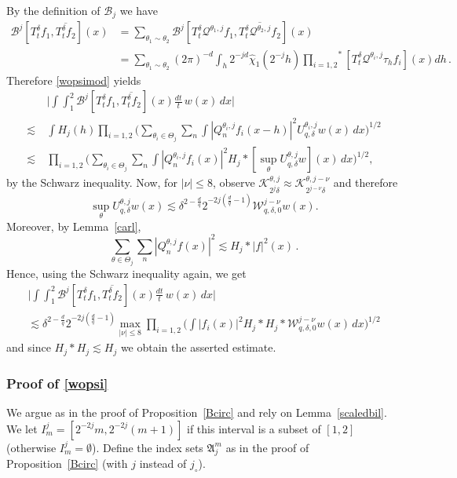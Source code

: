 \documentclass[11pt]{amsart}
\theoremstyle{definition}
\numberwithin{theorem}{section}
\numberwithin{definition}{section}
\def\prodstar{{\prod_{i=1,2}}^{\!\!*}}
\newcommand{\note}[1]{\footnote{\texttt{\Small #1}}}
\def\lc{\lesssim}
\def\fA{{\mathfrak {A}}}
\def\cB{{\mathcal {B}}}
\def\cK{{\mathcal {K}}}
\def\cQ{{\mathcal {Q}}}
\def\cW{{\mathcal {W}}}
\begin{document}
By the definition of $\cB_j$ we have
\begin{align*}
\cB^j [T^\delta_t f_1,\overline{T^{\delta}_t f_2}](x)
&=\sum_{\theta_1\sim\theta_2}
\cB^j [T^\delta_t \cQ^{\theta_1,j}f_1,\overline{T^{\delta}_t\cQ^{\theta_2,j} f_2}](x)
\\
&=\sum_{\theta_1\sim\theta_2}(2\pi)^{-d} \int_h 2^{-jd}\widehat \chi_1(2^{-j}h)
\prodstar [T^\delta_t \cQ^{\theta_i,j}\tau_hf_i](x) dh\,.
\end{align*}
Therefore \eqref{wopsimod} yields
\begin{align*}
&\Big|\int\int_1^2 \cB^j [T^\delta_t f_1,\overline{T^{\delta}_t f_2}](x)
 \frac{dt}{t}\,w(x) \,dx\Big|
\\
\lc\ &
\int H_j(h) \prod_{i=1,2} \Big(\sum_{\theta_i\in \Theta_j}
\sum_n\int |Q^{\theta_i,j}_nf_i(x-h)|^2
U_{q,\delta}^{\theta_i,j} w(x)
\,dx\Big)^{1/2}
\\
\lc\ &
\prod_{i=1,2} \Big(\sum_{\theta_i\in \Theta_j}\sum_n\int |Q^{\theta_i,j}_nf_i(x)|^2
H_j*[\sup_{\theta}  U_{q,\delta}^{\theta,j} w](x)
\,dx\Big)^{1/2},
\end{align*}
by the Schwarz inequality.
Now, for $|\nu|\le 8$,  observe $\cK^{\theta, j}_{2^j\delta}\approx \cK^{\theta, j-\nu}_{2^{j-\nu}\delta}$
and therefore
$$\sup_{\theta}  U_{q,\delta}^{\theta,j} w(x)
\lc \delta^{2-\frac{d}{q}}2^{-2j(\frac dq-1)}
\cW^{j-\nu}_{q,\delta,0}w(x).$$ Moreover, by Lemma~\ref{carl},
$$\sum_{\theta\in \Theta_j}\sum_n|Q^{\theta,j}_nf(x)|^2  \lc H_j*|f|^2(x)\,.$$
Hence, using the Schwarz inequality again, we get
\begin{multline*}
\Big|\int\int_1^2 \cB^j [T^\delta_t f_1,\overline{T^{\delta}_t f_2}](x)
 \frac{dt}{t}\,w(x)\, dx\Big|
\\
\lc \delta^{2-\frac{d}{q}}2^{-2j(\frac dq-1)}
\max_{|\nu|\le 8}\prod_{i=1,2} \Big(\int|f_i(x)|^2 H_j*H_j*
\cW^{j-\nu}_{q,\delta,0}w(x)\, dx\Big)^{1/2}
\end{multline*}
and since $H_j*H_j\lc H_j$ we obtain the asserted estimate.

\subsubsection*{Proof of \eqref{wopsi}}
We argue as in the proof of Proposition~\ref{Bcirc} and rely on
Lemma~\ref{scaledbil}.
We let $I_m^j=[2^{-2j}m,2^{-2j}(m+1)]$ if this interval is a subset of $[1,2]$ (otherwise $I^j_m=\emptyset$).
Define the index sets
$\fA^m_j$ as in the proof of Proposition~\ref{Bcirc} (with $j$ instead of $j_\circ$).
\end{document}
